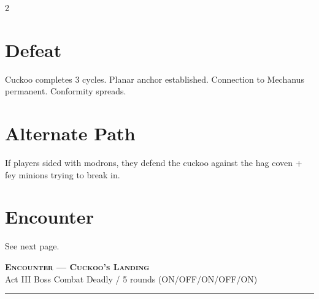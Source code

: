 \documentclass[10pt,letterpaper]{article}
\newcommand{\sceneheader}[4]{%
  \fancyhead[L]{\small\textcolor{accent}{\scshape #1}}%
  \fancyhead[R]{\small\textcolor{accent}{#2 \quad \textbullet \quad #3}}%
  \begin{center}
  {\LARGE\bfseries\scshape\textcolor{accent}{#1}}\\[2pt]
  {\small #2 \quad \textbullet \quad #3 \quad \textbullet \quad #4}\\[2pt]
  \textcolor{rulecol}{\rule{0.5\textwidth}{0.8pt}}
  \end{center}
  \vspace{-4pt}
}
\begin{document}
\begin{multicols}{2}
\section*{Defeat}
Cuckoo completes 3 cycles. Planar anchor established. Connection to Mechanus permanent. Conformity spreads.

\section*{Alternate Path}
If players sided with modrons, they defend the cuckoo against the hag coven + fey minions trying to break in.

\section*{Encounter}
See next page.

\end{multicols}

\newpage


\label{sec:enc-cuckoo}\sceneheader{Encounter --- Cuckoo's Landing}{Act III}{Boss Combat}{Deadly / 5 rounds (ON/OFF/ON/OFF/ON)}
\end{document}
